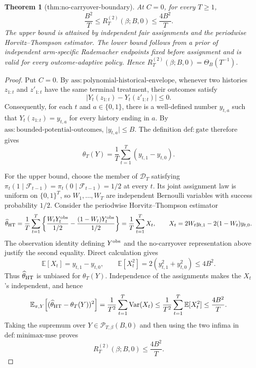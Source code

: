 \documentclass{article}
\newtheorem{theorem}{Theorem}
\begin{document}
\begin{theorem}[thm:no-carryover-boundary]\label{thm:no-carryover-boundary}
At \(C=0\), for every \(T\ge1\), \[\frac{B^2}{T}\le R_T^{(2)}(\beta;B,0)\le\frac{4B^2}{T}.\] The upper bound is attained by independent fair assignments and the periodwise Horvitz--Thompson estimator. The lower bound follows from a prior of independent arm-specific Rademacher endpoints fixed before assignment and is valid for every outcome-adaptive policy. Hence \(R_T^{(2)}(\beta;B,0)=\Theta_B(T^{-1})\).
\end{theorem}
\begin{proof}
Put \(C=0\).  By \(\mathrm{ass{:}polynomial\mbox{-}historical\mbox{-}envelope}\), whenever two histories \(z_{1:t}\) and \(z'_{1:t}\) have the same terminal treatment, their outcomes satisfy
\[
 \lvert Y_t(z_{1:t})-Y_t(z'_{1:t})\rvert\le 0.
\]
Consequently, for each \(t\) and \(a\in\{0,1\}\), there is a well-defined number \(y_{t,a}\) such that \(Y_t(z_{1:t})=y_{t,a}\) for every history ending in \(a\).  By \(\mathrm{ass{:}bounded\mbox{-}potential\mbox{-}outcomes}\), \(\lvert y_{t,a}\rvert\le B\).  The definition \(\mathrm{def{:}gate}\) therefore gives
\[
 \theta_T(Y)=\frac1T\sum_{t=1}^T(y_{t,1}-y_{t,0}).
\]

For the upper bound, choose the member of \(\mathcal D_T\) satisfying \(\pi_t(1\mid\mathcal F_{t-1})=\pi_t(0\mid\mathcal F_{t-1})=1/2\) at every \(t\).  Its joint assignment law is uniform on \(\{0,1\}^T\), so \(W_1,\ldots,W_T\) are independent Bernoulli variables with success probability \(1/2\).  Consider the periodwise Horvitz--Thompson estimator
\[
 \widehat\theta_{\rm HT}
 =\frac1T\sum_{t=1}^T
 \left\{\frac{W_tY_t^{\rm obs}}{1/2}
 -\frac{(1-W_t)Y_t^{\rm obs}}{1/2}\right\}
 =\frac1T\sum_{t=1}^T X_t,
 \qquad
 X_t=2W_ty_{t,1}-2(1-W_t)y_{t,0}.
\]
The observation identity defining \(Y^{\rm obs}\) and the no-carryover representation above justify the second equality.  Direct calculation gives
\[
 \mathbb E[X_t]=y_{t,1}-y_{t,0},
 \qquad
 \mathbb E[X_t^2]=2(y_{t,1}^2+y_{t,0}^2)\le 4B^2.
\]
Thus \(\widehat\theta_{\rm HT}\) is unbiased for \(\theta_T(Y)\).  Independence of the assignments makes the \(X_t\)'s independent, and hence
\[
 \mathbb E_{\pi,Y}\!\left[(\widehat\theta_{\rm HT}-\theta_T(Y))^2\right]
 =\frac1{T^2}\sum_{t=1}^T\operatorname{Var}(X_t)
 \le\frac1{T^2}\sum_{t=1}^T\mathbb E[X_t^2]
 \le\frac{4B^2}{T}.
\]
Taking the supremum over \(Y\in\mathcal P_{T,\beta}(B,0)\) and then using the two infima in \(\mathrm{def{:}minimax\mbox{-}mse}\) proves
\[
 R_T^{(2)}(\beta;B,0)\le \frac{4B^2}{T}.
\]


\end{proof}
\end{document}
